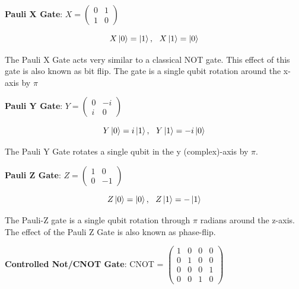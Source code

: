 \documentclass{article}
\begin{document}
\textbf{Pauli X Gate}: \qquad $X = \begin{pmatrix} 0 & 1 \\ 1 & 0 \end{pmatrix}$
\vspace{5mm}


\begin{equation}
X\ket{0} = \ket{1} , \ \ X\ket{1} = \ket{0}
\end{equation}
\vspace{5mm}

\noindent
The Pauli X Gate acts very similar to a classical NOT gate. This effect of this gate is also known as bit flip. The gate is a single qubit rotation around the x-axis by $\pi$
\vspace{5mm}


\textbf{Pauli Y Gate}: \qquad $Y = \begin{pmatrix} 0 & -i \\ i & 0 \end{pmatrix}$
\vspace{5mm}


\begin{equation}
Y\ket{0} = i\ket{1} , \ \ Y\ket{1} = -i\ket{0}
\end{equation}
\vspace{5mm}

\noindent
The Pauli Y Gate rotates a single qubit in the y (complex)-axis by $\pi$.
\vspace{5mm}


\textbf{Pauli Z Gate}: \qquad $Z = \begin{pmatrix} 1 & 0 \\ 0 & -1 \end{pmatrix}$
\vspace{5mm}


\begin{equation}
Z\ket{0} = \ket{0} , \ \ Z\ket{1} = -\ket{1}  
\end{equation}
\vspace{5mm}

\noindent
The Pauli-Z gate is a single qubit rotation through $\pi$ radians around the z-axis. The effect of the Pauli Z Gate is also known as phase-flip.
\vspace{5mm}

\textbf{Controlled Not/CNOT Gate}: \qquad CNOT = $\begin{pmatrix} 1 & 0 & 0 & 0 \\ 0 & 1 & 0 & 0 \\ 0 & 0 & 0 & 1 \\ 0 & 0 & 1 & 0 \end{pmatrix}$
\vspace{5mm}
\end{document}
